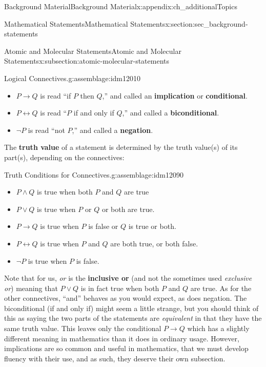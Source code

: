 \documentclass[oneside,10pt,]{book}
\newcommand{\terminology}[1]{\textbf{#1}}
\numberwithin{equation}{chapter}
\def\iff{\leftrightarrow}
\def\imp{\rightarrow}
\begin{document}
\begin{appendixptx}{Background Material}{}{Background Material}{}{}{x:appendix:ch_additionalTopics}
\begin{sectionptx}{Mathematical Statements}{}{Mathematical Statements}{}{}{x:section:sec_background-statements}
\begin{subsectionptx}{Atomic and Molecular Statements}{}{Atomic and Molecular Statements}{}{}{x:subsection:atomic-molecular-statements}
\begin{assemblage}{Logical Connectives.}{g:assemblage:idm12010}
\begin{itemize}[label=\textbullet]
\item{}\(P \imp Q\) is read ``if \(P\) then \(Q\),'' and called an \terminology{implication} or \terminology{conditional}.    %
\item{}\(P \iff Q\) is read ``\(P\) if and only if \(Q\),'' and called a \terminology{biconditional}.   %
\item{}\(\neg P\) is read ``not \(P\),'' and called a \terminology{negation}.  \label{g:notation:idm12085}%
\end{itemize}
%
\end{assemblage}
The \terminology{truth value} of a statement is determined by the truth value(s) of its part(s), depending on the connectives:%
\begin{assemblage}{Truth Conditions for Connectives.}{g:assemblage:idm12090}%
%
\begin{itemize}[label=\textbullet]
\item{}\(P \wedge Q\) is true when both \(P\) and \(Q\) are true%
\item{}\(P \vee Q\) is true when \(P\) or \(Q\) or both are true.%
\item{}\(P \imp Q\) is true when \(P\) is false or \(Q\) is true or both.%
\item{}\(P \iff Q\) is true when \(P\) and \(Q\) are both true, or both false.%
\item{}\(\neg P\) is true when \(P\) is false.%
\end{itemize}
%
\end{assemblage}
Note that for us, \emph{or} is the \terminology{inclusive or}  (and not the sometimes used \emph{exclusive or}) meaning that \(P \vee Q\) is in fact true when both \(P\) and \(Q\) are true. As for the other connectives, ``and'' behaves as you would expect, as does negation. The biconditional (if and only if) might seem a little strange, but you should think of this as saying the two parts of the statements are \emph{equivalent} in that they have the same truth value. This leaves only the conditional \(P \imp Q\) which has a slightly different meaning in mathematics than it does in ordinary usage. However, implications are so common and useful in mathematics, that we must develop fluency with their use, and as such, they deserve their own subsection.%
\end{subsectionptx}

\end{sectionptx}
\end{appendixptx}
\end{document}
